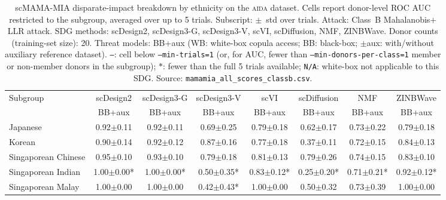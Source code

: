 \begin{table}[ht]
\centering
\small
\caption{scMAMA-MIA disparate-impact breakdown by ethnicity on the \textsc{aida} dataset. Cells report donor-level ROC AUC restricted to the subgroup, averaged over up to 5 trials. Subscript: $\pm$~std over trials. Attack: Class~B Mahalanobis$+$LLR attack. SDG methods: scDesign2, scDesign3-G, scDesign3-V, scVI, scDiffusion, NMF, ZINBWave. Donor counts (training-set size): 20. Threat models: BB+aux (WB: white-box copula access; BB: black-box; $\pm$aux: with/without auxiliary reference dataset). \texttt{---}: cell below \texttt{--min-trials=1} (or, for AUC, fewer than \texttt{--min-donors-per-class=1} member or non-member donors in the subgroup); $*$: fewer than the full 5 trials available; \texttt{N/A}: white-box not applicable to this SDG. Source: \texttt{mamamia_all_scores_classb.csv}.}
\label{tab:subgroup_aida_ethnicity_classb_sd2-sd3g-sd3v-scvi-scdiff-nmf-zinbwave_20d_100_auc}
\begin{tabular}{lccccccc}
\toprule
Subgroup & \multicolumn{1}{c|}{scDesign2} & \multicolumn{1}{c|}{scDesign3-G} & \multicolumn{1}{c|}{scDesign3-V} & \multicolumn{1}{c|}{scVI} & \multicolumn{1}{c|}{scDiffusion} & \multicolumn{1}{c|}{NMF} & \multicolumn{1}{c}{ZINBWave} \\
 & BB+aux & BB+aux & BB+aux & BB+aux & BB+aux & BB+aux & BB+aux \\
\midrule
Japanese & 0.92{\scriptsize$\pm$0.11} & 0.92{\scriptsize$\pm$0.11} & 0.69{\scriptsize$\pm$0.25} & 0.79{\scriptsize$\pm$0.18} & 0.62{\scriptsize$\pm$0.17} & 0.73{\scriptsize$\pm$0.22} & 0.79{\scriptsize$\pm$0.18} \\
Korean & 0.90{\scriptsize$\pm$0.14} & 0.92{\scriptsize$\pm$0.12} & 0.87{\scriptsize$\pm$0.16} & 0.77{\scriptsize$\pm$0.18} & 0.37{\scriptsize$\pm$0.11} & 0.72{\scriptsize$\pm$0.15} & 0.84{\scriptsize$\pm$0.13} \\
Singaporean Chinese & 0.95{\scriptsize$\pm$0.10} & 0.93{\scriptsize$\pm$0.10} & 0.79{\scriptsize$\pm$0.18} & 0.81{\scriptsize$\pm$0.13} & 0.79{\scriptsize$\pm$0.26} & 0.74{\scriptsize$\pm$0.15} & 0.83{\scriptsize$\pm$0.10} \\
Singaporean Indian & 1.00{\scriptsize$\pm$0.00}* & 1.00{\scriptsize$\pm$0.00}* & 0.50{\scriptsize$\pm$0.35}* & 0.83{\scriptsize$\pm$0.12}* & 0.25{\scriptsize$\pm$0.20}* & 0.71{\scriptsize$\pm$0.21}* & 0.92{\scriptsize$\pm$0.12}* \\
Singaporean Malay & 1.00{\scriptsize$\pm$0.00} & 1.00{\scriptsize$\pm$0.00} & 0.42{\scriptsize$\pm$0.43}* & 1.00{\scriptsize$\pm$0.00} & 0.50{\scriptsize$\pm$0.32} & 0.73{\scriptsize$\pm$0.39} & 1.00{\scriptsize$\pm$0.00} \\
\bottomrule
\end{tabular}
\end{table}

